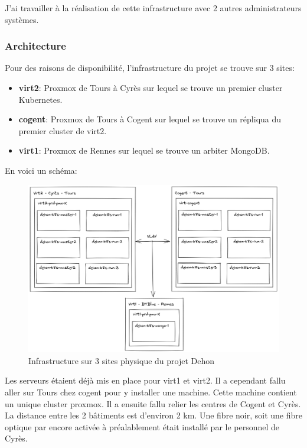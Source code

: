 \documentclass[12pt]{article}
\begin{document}
J'ai travailler à la réalisation de cette infrastructure avec 2 autres administrateurs systèmes.

\subsubsection{Architecture}
Pour des raisons de disponibilité, l'infrastructure du projet se trouve sur 3 sites:
\begin{itemize}
    \item \textbf{virt2}: Proxmox de Tours à Cyrès sur lequel se trouve un premier cluster Kubernetes.
    \item \textbf{cogent}: Proxmox de Tours à Cogent sur lequel se trouve un répliqua du premier cluster de virt2.
    \item \textbf{virt1}: Proxmox de Rennes sur lequel se trouve un arbiter MongoDB. 
\end{itemize}

\newpage
En voici un schéma:
\begin{figure}[!ht]
    \centering
        \includegraphics[width=\textwidth]{src/Dehon1.png}
    \caption{Infrastructure sur 3 sites physique du projet Dehon}
    \label{fig:dehon1}
\end{figure}

Les serveurs étaient déjà mis en place pour virt1 et virt2. 
Il a cependant fallu aller sur Tours chez cogent pour y installer une machine. 
Cette machine contient un unique cluster proxmox. 
Il a ensuite fallu relier les centres de Cogent et Cyrès. 
La distance entre les 2 bâtiments est d'environ 2 km. 
Une fibre noir, soit une fibre optique par encore activée à préalablement était installé par le personnel de Cyrès.
\end{document}
